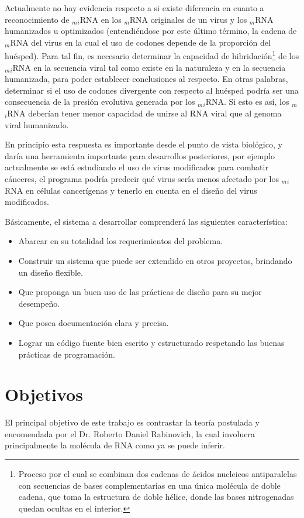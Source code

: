 \par Actualmente no hay evidencia respecto a si existe diferencia en cuanto a reconocimiento de $_m$$_i$RNA en los $_m$RNA originales de un virus y los $_m$RNA humanizados u optimizados (entendiéndose por este último término, la cadena de $_m$RNA del virus en la cual el uso de codones depende de la proporción del huésped). Para tal fin, es necesario determinar la capacidad de hibridación\footnote{Proceso por el cual se combinan dos cadenas de ácidos nucleicos antiparalelas con secuencias de bases complementarias en una única molécula de doble cadena, que toma la estructura de doble hélice, donde las bases nitrogenadas quedan ocultas en el interior.} de los $_m$$_i$RNA en la secuencia viral tal como existe en la naturaleza y en la secuencia humanizada, para poder establecer conclusiones al respecto. En otras palabras, determinar si el uso de codones divergente con respecto al huésped podría ser una consecuencia de la presión evolutiva generada por los $_m$$_i$RNA. Si esto es así, los $_m$$_i$RNA deberían tener menor capacidad de unirse al RNA viral que al genoma viral humanizado. 

\par En principio esta respuesta es importante desde el punto de vista biológico, y daría una herramienta importante para desarrollos posteriores, por ejemplo actualmente se está estudiando el uso de virus modificados para combatir cánceres, el programa podría predecir qué virus sería menos afectado por los $_m$$_i$RNA en células cancerígenas y tenerlo en cuenta en el diseño del virus modificados.

\par Básicamente, el sistema a desarrollar comprenderá las siguientes característica:
\begin{itemize}
	\item Abarcar en su totalidad los requerimientos del problema.
	\item Construir un sistema que puede ser extendido en otros proyectos, brindando un diseño flexible. 
	\item Que proponga un buen uso de las prácticas de diseño para su mejor desempeño.
	\item Que posea documentación clara y precisa.
	\item Lograr un código fuente bien escrito y estructurado respetando las buenas prácticas de programación.
\end{itemize}

\section{Objetivos}
\par El principal objetivo de este trabajo es contrastar la teoría postulada y encomendada por el Dr. Roberto Daniel Rabinovich, la cual involucra principalmente la molécula de RNA como ya se puede inferir. 

